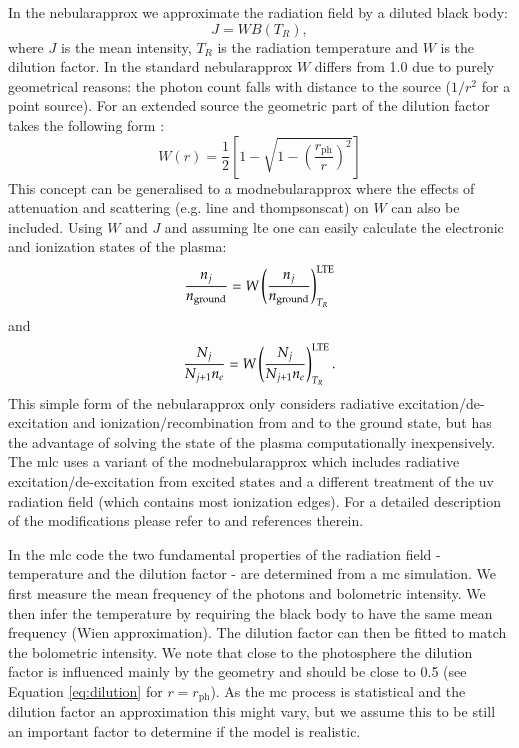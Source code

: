 In the \gls{nebularapprox} we approximate the radiation field by a diluted black body:
\[
J = W B(T_R),
\]
where $J$ is the mean intensity, $T_R$ is the radiation temperature and $W$ is the dilution factor. In the standard \gls{nebularapprox} $W$ differs from 1.0 due to purely geometrical reasons: the photon count falls with distance to the source ($1/r^2$ for a point source). For an extended source the geometric part of the dilution factor takes the following form \citep{1978stat.book.....M}:
\begin{equation}
W(r) = \frac{1}{2}\left[1-\sqrt{1-\left(\frac{r_\textrm{ph}}{r}\right)^2}\right]
\label{eq:dilution}
\end{equation}
This concept can be generalised to a \gls{modnebularapprox} where the effects of attenuation and scattering (e.g. line and \gls{thompsonscat}) on $W$ can also be included. Using $W$ and $J$ and assuming \gls{lte} one can easily calculate the electronic and ionization states of the plasma:
\[
\frac{n_j}{n_{\rm ground}} = W \left( \frac{n_j}{n_{\rm ground}} \right) _{T_R}^{\rm LTE}
\]
and 
\[
\frac{N_j}{N_{j+1}n_e} = W \left( \frac{N_j}{N_{j+1}n_e} \right) _{T_R}^{\rm LTE}.
\]
This simple form of the \gls{nebularapprox} only considers radiative excitation/de-excitation and ionization/recombination from and to the ground state, but has the advantage of solving the state of the plasma computationally inexpensively.
The \gls{mlc} uses a variant of the \gls{modnebularapprox} which includes radiative excitation/de-excitation from excited states and a different treatment of the \gls{uv} radiation field (which contains most ionization edges). For a detailed description of the modifications please refer to \citet{1993A&A...279..447M} and references therein. 

In the \gls{mlc} code the two fundamental properties of the radiation field - temperature and the dilution factor - are determined from a \gls{mc} simulation. We first measure the mean frequency of the photons and bolometric intensity. We then infer the temperature by requiring the black body to have the same mean frequency (Wien approximation). The dilution factor can then be fitted to match the bolometric intensity. We note that close to the photosphere the dilution factor is influenced mainly by the geometry and should be close to 0.5 (see Equation \ref{eq:dilution} for $r=r_\textrm{ph}$). As the \gls{mc} process is statistical and the dilution factor an approximation this might vary, but we assume this to be still an important factor to determine if the model is realistic. 

